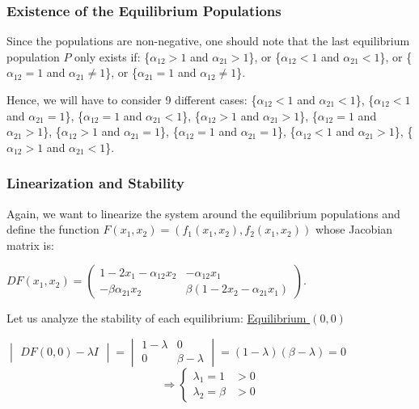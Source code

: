 \documentclass[11pt,a4paper]{scrartcl}
\theoremstyle{definition}
\begin{document}
\subsubsection{Existence of the Equilibrium Populations}

Since the populations are non-negative, one should note that the last equilibrium population $P$ only exists if: \Big\{$\alpha_{12} > 1$ and $\alpha_{21} > 1$\Big\}, or \Big\{$\alpha_{12} < 1$ and $\alpha_{21} < 1$\Big\}, or \Big\{$\alpha_{12}=1$ and $\alpha_{21}\neq 1$\Big\}, or \Big\{$\alpha_{21}=1$ and $\alpha_{12} \neq 1$\Big\}.
\newline

Hence, we will have to consider 9 different cases: \Big\{$\alpha_{12} < 1$ and $\alpha_{21} < 1$\Big\}, \Big\{$\alpha_{12} < 1$ and $\alpha_{21} = 1$\Big\}, \Big\{$\alpha_{12} = 1$ and $\alpha_{21} < 1$\Big\}, \Big\{$\alpha_{12} > 1$ and $\alpha_{21} > 1$\Big\}, \Big\{$\alpha_{12} = 1$ and $\alpha_{21} > 1$\Big\}, \Big\{$\alpha_{12} > 1$ and $\alpha_{21} = 1$\Big\}, \Big\{$\alpha_{12} = 1$ and $\alpha_{21} = 1$\Big\}, \Big\{$\alpha_{12} < 1$ and $\alpha_{21} > 1$\Big\}, \Big\{$\alpha_{12} > 1$ and $\alpha_{21} < 1$\Big\}.

\subsubsection{Linearization and Stability}

Again, we want to linearize the system around the equilibrium populations and define the function $F(x_1,x_2)=(f_1(x_1, x_2), f_2(x_1, x_2))$ whose Jacobian matrix is:

\begin{center}
$DF(x_1,x_2)=\begin{pmatrix}
	1-2x_1-\alpha_{12}x_2 & -\alpha_{12}x_1 \\
	- \beta \alpha_{21}x_2 & \beta (1-2x_2-\alpha_{21}x_1)
\end{pmatrix}$.
\end{center}

Let us analyze the stability of each equilibrium:
\newline
\newpage
\underline{Equilibrium $(0, 0)$}

\begin{center}
$\begin{vmatrix}
	DF(0,0)-\lambda I
\end{vmatrix}=\begin{vmatrix}
	1-\lambda & 0 \\
	0 & \beta - \lambda
\end{vmatrix}=(1-\lambda)(\beta-\lambda)=0$ \[ \Rightarrow \left\{ \begin{array}{ll}
         \lambda_1=1 & \mbox{$>0$}\\
        \lambda_2=\beta & \mbox{$>0$} \end{array} \right. \] 
\end{center}
\end{document}

